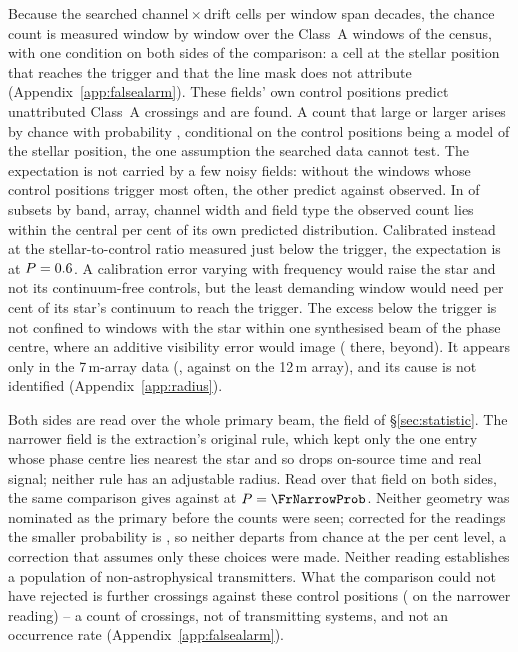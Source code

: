Because the searched channel\,$\times$\,drift cells per window span
\TuCellsDecades{} decades, the chance count is measured window by window over
the \CeNWin{} Class~A windows of the census, with one condition on both sides of
the comparison: a cell at the stellar position that reaches the trigger and
that the line mask does not attribute (Appendix~\ref{app:falsealarm}). These
fields' own control positions predict \CeExp{} unattributed Class~A crossings
and \CeObs{} are found. A count that large or larger arises by chance with
probability \CeProbNull{}, conditional on the control positions being a model
of the stellar position, the one assumption the searched data cannot test.
The expectation is not carried by a few noisy fields: without the
\BgTopNWord{} windows whose control positions trigger most often, the other
\BgDropTenNWin{} predict \BgDropTenExp{} against \BgDropTenObs{} observed. In \BgNConfIn{} of \BgNConf{} subsets by band, array, channel width and field
type the observed count lies within the central \CeCovPct{} per cent of its own
predicted distribution. Calibrated instead at the stellar-to-control ratio
\CeNear{} measured just below the trigger, the expectation is \CeExpNear{} at
$P=0.6$. A calibration error varying with frequency would raise the
star and not its continuum-free controls, but the least demanding window would
need \CyEpsMinPct{} per cent of its star's continuum to reach the trigger. The
excess below the trigger is not confined to windows with
the star within one synthesised beam of the phase centre, where an additive
visibility error would image (\BgPcOnRatio{} there, \BgPcOffRatio{} beyond). It appears only in the
7\,m-array data (\BgArrSevenRatio, against \BgArrTwelveRatio{} on the 12\,m
array), and its cause is not identified
(Appendix~\ref{app:radius}).

Both sides are read over the whole primary beam, the field of
\S\ref{sec:statistic}. The narrower field is the
extraction's original rule, which kept only the one entry whose phase centre
lies nearest the star and so drops on-source time and real signal; neither
rule has an adjustable radius. Read over that field on both sides, the same
comparison gives \FrNarrowObs{} against \FrNarrowExp{} at $P=\FrNarrowProb$.
Neither geometry was nominated as the primary before the counts were seen;
corrected for the \FrNRead{} readings the smaller probability is
\FrTwoTrialP, so neither departs from chance at the \CeAlphaPct{} per cent
level, a correction that assumes only these \FrNRead{} choices were made.
Neither reading establishes a population of non-astrophysical transmitters.
What the comparison could not have rejected is \CeAddLim{} further crossings
against these control positions (\FrNarrowAddLim{} on the narrower reading)
-- a count of
crossings, not of transmitting systems, and not an occurrence rate
(Appendix~\ref{app:falsealarm}).

